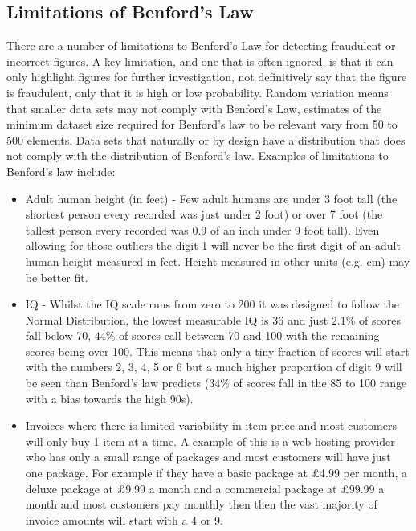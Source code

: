 \subsection{Limitations of Benford's Law}
There are a number of limitations to Benford's Law for detecting fraudulent or incorrect figures.  A key limitation, and one that is often ignored, is that it can only highlight figures for further investigation, not definitively say that the figure is fraudulent, only that it is high or low probability.  Random variation means that smaller data sets may not comply with Benford's Law, estimates of the minimum dataset size required for Benford's law to be relevant vary from 50 to 500 elements. Data sets that naturally or by design have a distribution that does not comply with the distribution of Benford's law.  Examples of limitations to Benford's law include:
\begin{itemize}
\item Adult human height (in feet) - Few adult humans are under 3 foot tall (the shortest person every recorded was just under 2 foot) or over 7 foot (the tallest person every recorded was 0.9 of an inch under 9 foot tall).  Even allowing for those outliers the digit 1 will never be the first digit of an adult human height measured in feet.  Height measured in other units (e.g. cm) may be  better fit.
\item IQ - Whilst the IQ scale runs from zero to 200 it was designed to follow the Normal Distribution,  the lowest measurable IQ is 36 and just $2.1\% $ of scores fall below 70, $44\%$ of scores call between 70 and 100 with the remaining scores being over 100.  This means that only a tiny fraction of scores will start with the numbers 2, 3, 4, 5 or 6 but a much higher proportion  of digit 9 will be seen than Benford's law predicts ($34\%$ of scores fall in the 85 to 100 range with a bias towards the high 90s).
\item Invoices where there is limited variability in item price and most customers will only buy 1 item at a time.  A example of this is a web hosting provider who has only a small range of packages and most customers will have just one package.  For example if they have a basic package at £4.99 per month, a deluxe package at £9.99 a month and a commercial package at £99.99 a month and most customers pay monthly then then the vast majority of invoice amounts will start with a 4 or 9.
\end{itemize}


